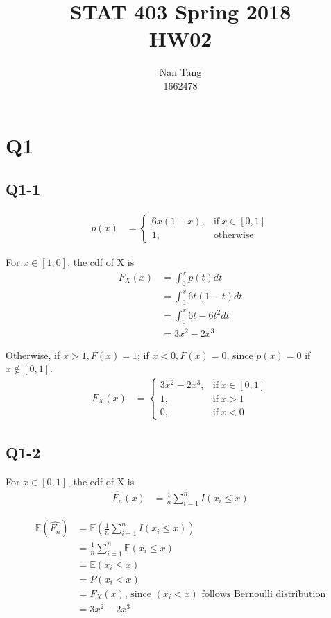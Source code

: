 \documentclass[12pt,letterpaper]{article}
\author{Nan Tang\\1662478}
\title{STAT 403 Spring 2018\\HW02}
\let\hat\widehat
\begin{document}
\maketitle

\section*{Q1}

\subsection*{Q1-1}

\begin{align*}
p(x) &= 
\begin{cases}
      6x(1-x), & \text{if}\ x \in [0, 1] \\
      1, & \text{otherwise}
\end{cases}
\end{align*}

\noindent For $x \in [1, 0]$, the cdf of X is 
\begin{align*}
F_X(x) &= \int_{0}^{x} p(t) dt\\
&= \int_{0}^{x} 6t(1-t) dt \\
&= \int_{0}^{x}6t - 6t^2 dt \\
&= 3x^2 - 2x^3
\end{align*}

\noindent Otherwise, if $x > 1, F(x) = 1$; if $x < 0, F(x) = 0$, since $p(x) = 0$ if $x \notin [0, 1]$.
\begin{align*}
F_X(x) &= 
\begin{cases}
      3x^2 - 2x^3, & \text{if}\ x \in [0, 1] \\
      1, & \text{if}\ x > 1 \\
      0, & \text{if}\ x < 0 
\end{cases}
\end{align*}

\subsection*{Q1-2}
\noindent For $x \in [0, 1]$, the edf of X is
\begin{align*}
\hat{F_n}(x) &= \frac{1}{n} \sum_{i=1}^{n} I(x_i \leq x)
\end{align*}

\begin{align*}
\mathbb{E}(\hat{F_n}) &= \mathbb{E}( \frac{1}{n} \sum_{i=1}^{n} I(x_i \leq x)) \\
&=  \frac{1}{n} \sum_{i=1}^{n} \mathbb{E}(x_i \leq x) \\
&=  \mathbb{E}(x_i \leq x) \\
&= P(x_i < x) \\
&= F_X(x) \text{, since $(x_i < x)$ follows Bernoulli distribution}\\
&= 3x^2 - 2x^3
\end{align*}
\end{document}
